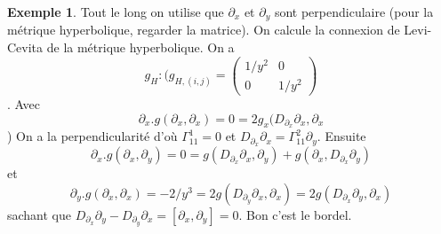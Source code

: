 \documentclass[a4paper,12pt]{book}
\theoremstyle{plain}
\theoremstyle{definition}
\newtheorem{ex}[subsection]{Exemple}
\theoremstyle{remark}
\begin{document}
\begin{ex}
    Tout le long on utilise que $\partial_x$ et $\partial_y$ sont
    perpendiculaire (pour la métrique hyperbolique, regarder la matrice).
    On calcule la connexion de Levi-Cevita de la métrique hyperbolique.
    On a \[g_H\colon (g_{H,(i,j)}=\begin{pmatrix}1/y^2&0\\0&1/y^2\end{pmatrix}\].
    Avec \[\partial_x.g(\partial_x,\partial_x)=0=2g_x(D_{\partial_x}\partial_x,\partial_x\]) 
    On a la perpendicularité d'où $\Gamma_{11}^1=0$ et $D_{\partial_x}\partial_x=\Gamma_{11}^2\partial_y$.
    Ensuite \[\partial_x.g(\partial_x,\partial_y)=0=g(D_{\partial_x}\partial_x,
    \partial_y)+g(\partial_x,D_{\partial_x}\partial_y)\]
    et \[\partial_y.g(\partial_x,\partial_x)=-2/y^3=2g(D_{\partial_y}\partial_x,\partial_x)=2g(D_{\partial_x}\partial_y,\partial_x)\]
    sachant que $D_{\partial_x}\partial_y-D_{\partial_y}\partial_x=
    [\partial_x,\partial_y]=0$.
    Bon c'est le bordel.
\end{ex}
\end{document}
